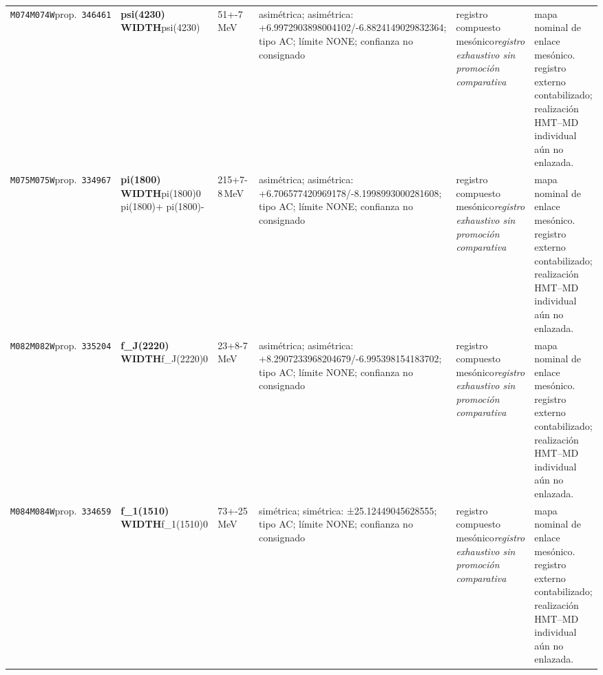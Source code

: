 \begin{landscape}
\begin{longtable}{L{1.85cm}L{4.45cm}L{2.35cm}L{4.05cm}L{3.35cm}L{7.15cm}}
\texttt{M074}\newline \texttt{M074W}\newline prop.\ \texttt{346461} & \textbf{psi(4230) WIDTH}\newline psi(4230) & 51+-7\,MeV & asimétrica; asimétrica: +6.9972903898004102/-6.8824149029832364; tipo AC; límite NONE; confianza no consignado & registro compuesto mesónico\newline \emph{registro exhaustivo sin promoción comparativa} & mapa nominal de enlace mesónico. registro externo contabilizado; realización HMT--MD individual aún no enlazada. \\
\texttt{M075}\newline \texttt{M075W}\newline prop.\ \texttt{334967} & \textbf{pi(1800) WIDTH}\newline pi(1800)0 \textbar{}\allowbreak{} pi(1800)+ \textbar{}\allowbreak{} pi(1800)- & 215+7-8\,MeV & asimétrica; asimétrica: +6.706577420969178/-8.1998993000281608; tipo AC; límite NONE; confianza no consignado & registro compuesto mesónico\newline \emph{registro exhaustivo sin promoción comparativa} & mapa nominal de enlace mesónico. registro externo contabilizado; realización HMT--MD individual aún no enlazada. \\
\texttt{M082}\newline \texttt{M082W}\newline prop.\ \texttt{335204} & \textbf{f\_\allowbreak{}J(2220) WIDTH}\newline f\_\allowbreak{}J(2220)0 & 23+8-7\,MeV & asimétrica; asimétrica: +8.2907233968204679/-6.995398154183702; tipo AC; límite NONE; confianza no consignado & registro compuesto mesónico\newline \emph{registro exhaustivo sin promoción comparativa} & mapa nominal de enlace mesónico. registro externo contabilizado; realización HMT--MD individual aún no enlazada. \\
\texttt{M084}\newline \texttt{M084W}\newline prop.\ \texttt{334659} & \textbf{f\_\allowbreak{}1(1510) WIDTH}\newline f\_\allowbreak{}1(1510)0 & 73+-25\,MeV & simétrica; simétrica: ±25.12449045628555; tipo AC; límite NONE; confianza no consignado & registro compuesto mesónico\newline \emph{registro exhaustivo sin promoción comparativa} & mapa nominal de enlace mesónico. registro externo contabilizado; realización HMT--MD individual aún no enlazada. \\

\end{longtable}
\end{landscape}
